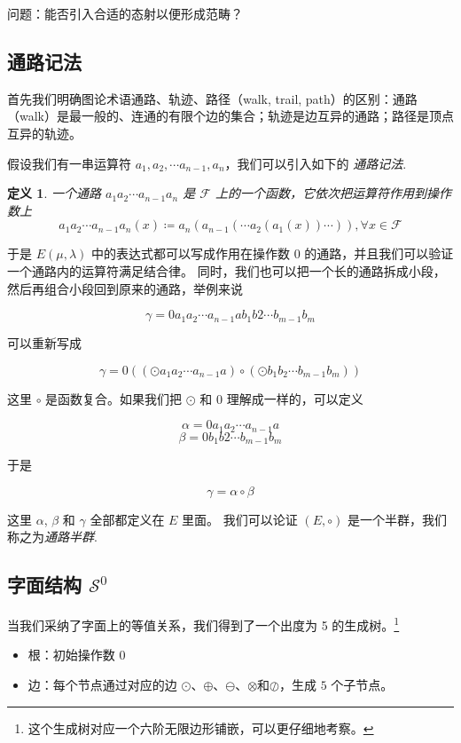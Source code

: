 \documentclass[a4paper,12pt]{article}
\newtheorem{definition}{定义}
\numberwithin{definition}{section}
\numberwithin{lemma}{section}
\numberwithin{proposition}{section}
\numberwithin{theorem}{section}
\numberwithin{grammar}{section}
\numberwithin{program}{section}
\numberwithin{convention}{section}
\numberwithin{corollary}{section}
\begin{document}
问题：能否引入合适的态射以便形成范畴？

\subsection{通路记法}\label{subsec:walknotion}

首先我们明确图论术语通路、轨迹、路径（walk, trail, path）的区别：通路（walk）是最一般的、连通的有限个边的集合；轨迹是边互异的通路；路径是顶点互异的轨迹。

假设我们有一串运算符 $a_1, a_2, \cdots a_{n-1}, a_n$，我们可以引入如下的 \emph{通路记法}.

\begin{definition}
\label{definition:path}
    一个通路 $a_1 a_2 \cdots a_{n-1} a_n$ 是 $\mathcal{F}$ 上的一个函数，它依次把运算符作用到操作数上
    $$a_1 a_2 \cdots a_{n-1} a_n (x) \coloneqq a_n( a_{n-1}( \cdots a_2( a_1(x) ) \cdots ) ), \forall x \in \mathcal{F}$$
\end{definition}

于是 $E(\mu, \lambda)$ 中的表达式都可以写成作用在操作数 $0$ 的通路，并且我们可以验证一个通路内的运算符满足结合律。
同时，我们也可以把一个长的通路拆成小段，然后再组合小段回到原来的通路，举例来说

$$\gamma = 0 a_1 a_2 \cdots a_{n-1} a b_1 b2 \cdots b_{m-1} b_m$$

可以重新写成

$$\gamma = 0 ((\odot a_1 a_2 \cdots a_{n-1} a) \circ (\odot b_1 b_2 \cdots b_{m-1} b_m))$$

这里 $\circ$ 是函数复合。如果我们把 $\odot$ 和 $0$ 理解成一样的，可以定义

$$\alpha = 0 a_1 a_2 \cdots a_{n-1} a$$
$$\beta = 0 b_1 b2 \cdots b_{m-1} b_m$$

于是

$$\gamma = \alpha \circ \beta$$

这里 $\alpha$, $\beta$ 和 $\gamma$ 全部都定义在 $E$ 里面。 我们可以论证 $(E, \circ)$ 是一个半群，我们称之为\emph{通路半群}.

\subsection{字面结构 $\mathcal{S}^0$}\label{subsec:literial}

当我们采纳了字面上的等值关系，我们得到了一个出度为 5 的生成树。\footnote[2]{这个生成树对应一个六阶无限边形铺嵌，可以更仔细地考察。}

\begin{itemize}
    \item 根：初始操作数 $0$
    \item 边：每个节点通过对应的边 $\odot$、$\oplus$、$\ominus$、$\otimes$和$\oslash$，生成 $5$ 个子节点。
\end{itemize}
\end{document}

